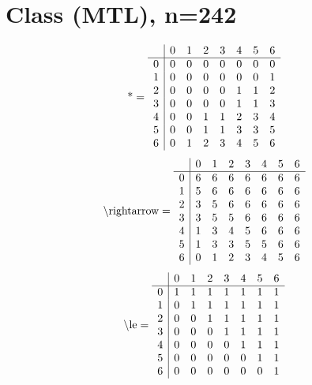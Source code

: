 \documentclass[11pt]{article}
\begin{document}
\section{Class (MTL), n=242}
\[\text{*} = 
\begin{array}{r | r r r r r r r}
 & 0 & 1 & 2 & 3 & 4 & 5 & 6 \\ \hline
0 & 0 & 0 & 0 & 0 & 0 & 0 & 0 \\
1 & 0 & 0 & 0 & 0 & 0 & 0 & 1 \\
2 & 0 & 0 & 0 & 0 & 1 & 1 & 2 \\
3 & 0 & 0 & 0 & 0 & 1 & 1 & 3 \\
4 & 0 & 0 & 1 & 1 & 2 & 3 & 4 \\
5 & 0 & 0 & 1 & 1 & 3 & 3 & 5 \\
6 & 0 & 1 & 2 & 3 & 4 & 5 & 6 \\
\end{array}
\]
\[\text{\textbackslash rightarrow} = 
\begin{array}{r | r r r r r r r}
 & 0 & 1 & 2 & 3 & 4 & 5 & 6 \\ \hline
0 & 6 & 6 & 6 & 6 & 6 & 6 & 6 \\
1 & 5 & 6 & 6 & 6 & 6 & 6 & 6 \\
2 & 3 & 5 & 6 & 6 & 6 & 6 & 6 \\
3 & 3 & 5 & 5 & 6 & 6 & 6 & 6 \\
4 & 1 & 3 & 4 & 5 & 6 & 6 & 6 \\
5 & 1 & 3 & 3 & 5 & 5 & 6 & 6 \\
6 & 0 & 1 & 2 & 3 & 4 & 5 & 6 \\
\end{array}
\]
\[\text{\textbackslash le} = 
\begin{array}{r | r r r r r r r}
 & 0 & 1 & 2 & 3 & 4 & 5 & 6 \\ \hline
0 & 1 & 1 & 1 & 1 & 1 & 1 & 1 \\
1 & 0 & 1 & 1 & 1 & 1 & 1 & 1 \\
2 & 0 & 0 & 1 & 1 & 1 & 1 & 1 \\
3 & 0 & 0 & 0 & 1 & 1 & 1 & 1 \\
4 & 0 & 0 & 0 & 0 & 1 & 1 & 1 \\
5 & 0 & 0 & 0 & 0 & 0 & 1 & 1 \\
6 & 0 & 0 & 0 & 0 & 0 & 0 & 1 \\
\end{array}
\]
\end{document}
